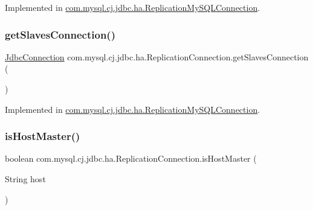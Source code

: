 Implemented in \mbox{\hyperlink{classcom_1_1mysql_1_1cj_1_1jdbc_1_1ha_1_1_replication_my_s_q_l_connection_ac5b7f61a6500ebb3006957d7f32f407d}{com.\+mysql.\+cj.\+jdbc.\+ha.\+Replication\+My\+S\+Q\+L\+Connection}}.

\mbox{\label{interfacecom_1_1mysql_1_1cj_1_1jdbc_1_1ha_1_1_replication_connection_aa5f54ad265b6462d4d2b13ae3b4cdc5c}} 
\subsubsection{\texorpdfstring{get\+Slaves\+Connection()}{getSlavesConnection()}}
{\footnotesize\ttfamily \mbox{\hyperlink{interfacecom_1_1mysql_1_1cj_1_1jdbc_1_1_jdbc_connection}{Jdbc\+Connection}} com.\+mysql.\+cj.\+jdbc.\+ha.\+Replication\+Connection.\+get\+Slaves\+Connection (\begin{DoxyParamCaption}{ }\end{DoxyParamCaption})}



Implemented in \mbox{\hyperlink{classcom_1_1mysql_1_1cj_1_1jdbc_1_1ha_1_1_replication_my_s_q_l_connection_a088e6456dc0dd8f90f7ded1aed7a6324}{com.\+mysql.\+cj.\+jdbc.\+ha.\+Replication\+My\+S\+Q\+L\+Connection}}.

\mbox{\label{interfacecom_1_1mysql_1_1cj_1_1jdbc_1_1ha_1_1_replication_connection_a4b69699e70dfff96adec746e2c6e7254}} 
\subsubsection{\texorpdfstring{is\+Host\+Master()}{isHostMaster()}}
{\footnotesize\ttfamily boolean com.\+mysql.\+cj.\+jdbc.\+ha.\+Replication\+Connection.\+is\+Host\+Master (\begin{DoxyParamCaption}\item[{String}]{host }\end{DoxyParamCaption})}



